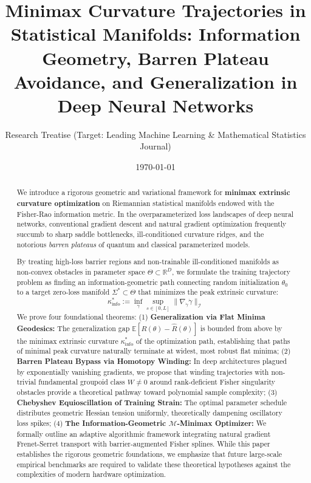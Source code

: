 \documentclass[11pt,reqno]{amsart}
\theoremstyle{definition}
\providecommand{\R}{\mathbb{R}}
\newcommand{\E}{\mathbb{E}}
\newcommand{\Fisher}{\mathcal{I}}
\numberwithin{equation}{section}
\providecommand{\R}{\mathbb{R}}
\begin{document}
\title[Minimax Curvature in Information Geometry and Deep Learning]{Minimax Curvature Trajectories in Statistical Manifolds: Information Geometry, Barren Plateau Avoidance, and Generalization in Deep Neural Networks}

\author{Research Treatise (Target: Leading Machine Learning \& Mathematical Statistics Journal)}
\address{Department of Applied Mathematics and Computer Science}

\date{\today}

\begin{abstract}
We introduce a rigorous geometric and variational framework for \textbf{minimax extrinsic curvature optimization} on Riemannian statistical manifolds endowed with the Fisher-Rao information metric. In the overparameterized loss landscapes of deep neural networks, conventional gradient descent and natural gradient optimization frequently succumb to sharp saddle bottlenecks, ill-conditioned curvature ridges, and the notorious \emph{barren plateaus} of quantum and classical parameterized models. 

By treating high-loss barrier regions and non-trainable ill-conditioned manifolds as non-convex obstacles in parameter space $\Theta \subset \R^D$, we formulate the training trajectory problem as finding an information-geometric path connecting random initialization $\theta_0$ to a target zero-loss manifold $\Sigma^* \subset \Theta$ that minimizes the peak extrinsic curvature:
\begin{equation}
\kappa^*_{\mathrm{info}} := \inf_{\gamma} \sup_{s \in [0, L]} \|\nabla_{\dot{\gamma}} \dot{\gamma}\|_{\Fisher}
\end{equation}
We prove four foundational theorems:
(1) \textbf{Generalization via Flat Minima Geodesics:} The generalization gap $\E[R(\theta) - \hat{R}(\theta)]$ is bounded from above by the minimax extrinsic curvature $\kappa^*_{\mathrm{info}}$ of the optimization path, establishing that paths of minimal peak curvature naturally terminate at widest, most robust flat minima;
(2) \textbf{Barren Plateau Bypass via Homotopy Winding:} In deep architectures plagued by exponentially vanishing gradients, we propose that winding trajectories with non-trivial fundamental groupoid class $W \neq 0$ around rank-deficient Fisher singularity obstacles provide a theoretical pathway toward polynomial sample complexity;
(3) \textbf{Chebyshev Equioscillation of Training Strain:} The optimal parameter schedule distributes geometric Hessian tension uniformly, theoretically dampening oscillatory loss spikes;
(4) \textbf{The Information-Geometric $\mathcal{M}$-Minimax Optimizer:} We formally outline an adaptive algorithmic framework integrating natural gradient Frenet-Serret transport with barrier-augmented Fisher splines. While this paper establishes the rigorous geometric foundations, we emphasize that future large-scale empirical benchmarks are required to validate these theoretical hypotheses against the complexities of modern hardware optimization.
\end{abstract}
\end{document}
